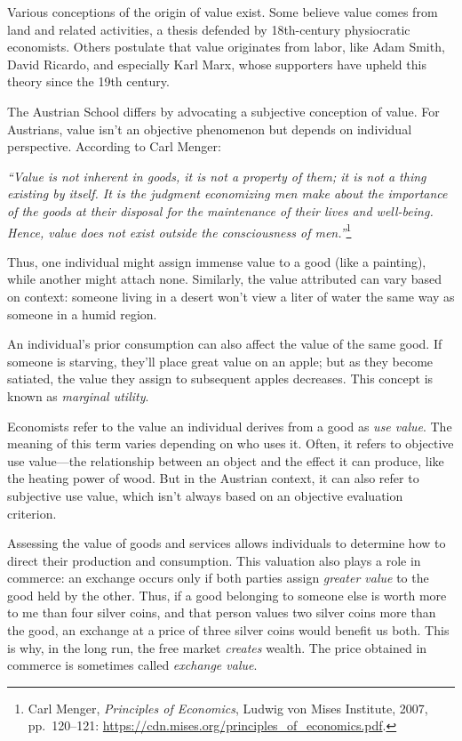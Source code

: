 \documentclass[
  a5paper,
  smalldemyvopaper,10pt,twoside,onecolumn,openright,extrafontsizes,hidelinks]{memoir}
\begin{document}
Various conceptions of the origin of value exist. Some believe value
comes from land and related activities, a thesis defended by
18th-century physiocratic economists. Others postulate that value
originates from labor, like Adam Smith, David Ricardo, and especially
Karl Marx, whose supporters have upheld this theory since the 19th
century.

The Austrian School differs by advocating a subjective conception of
value. For Austrians, value isn't an objective phenomenon but depends on
individual perspective. According to Carl Menger:

\emph{``Value is not inherent in goods, it is not a property of them; it
is not a thing existing by itself. It is the judgment economizing men
make about the importance of the goods at their disposal for the
maintenance of their lives and well-being. Hence, value does not exist
outside the consciousness of men.''}\footnote{Carl Menger,
  \emph{Principles of Economics}, Ludwig von Mises Institute, 2007,
  pp.~120--121: \url{https://cdn.mises.org/principles_of_economics.pdf}.}

Thus, one individual might assign immense value to a good (like a
painting), while another might attach none. Similarly, the value
attributed can vary based on context: someone living in a desert won't
view a liter of water the same way as someone in a humid region.

An individual's prior consumption can also affect the value of the same
good. If someone is starving, they'll place great value on an apple; but
as they become satiated, the value they assign to subsequent apples
decreases. This concept is known as \emph{marginal utility}.

Economists refer to the value an individual derives from a good as
\emph{use value}. The meaning of this term varies depending on who uses
it. Often, it refers to objective use value---the relationship between
an object and the effect it can produce, like the heating power of wood.
But in the Austrian context, it can also refer to subjective use value,
which isn't always based on an objective evaluation criterion.

Assessing the value of goods and services allows individuals to
determine how to direct their production and consumption. This valuation
also plays a role in commerce: an exchange occurs only if both parties
assign \emph{greater value} to the good held by the other. Thus, if a
good belonging to someone else is worth more to me than four silver
coins, and that person values two silver coins more than the good, an
exchange at a price of three silver coins would benefit us both. This is
why, in the long run, the free market \emph{creates} wealth. The price
obtained in commerce is sometimes called \emph{exchange value}.
\end{document}
